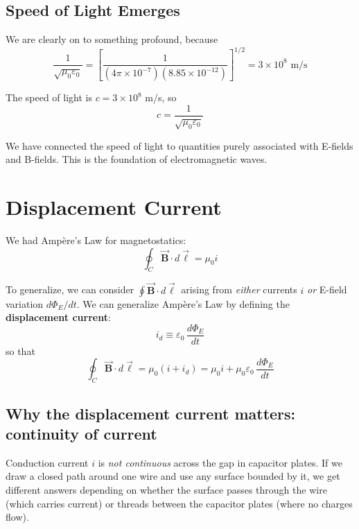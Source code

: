 \documentclass[11pt]{report}
\newcommand{\vbf}[1]{\vec{\mathbf{#1}}}
\begin{document}
\subsection*{Speed of Light Emerges}

We are clearly on to something profound, because
\begin{equation}
\frac{1}{\sqrt{\mu_0\varepsilon_0}} = \left[\frac{1}{(4\pi\times 10^{-7})(8.85\times 10^{-12})}\right]^{1/2} = 3\times 10^8\text{ m/s}
\end{equation}

The speed of light is $c = 3\times 10^8$ m/s, so
\begin{equation}
\boxed{c = \frac{1}{\sqrt{\mu_0\varepsilon_0}}}
\end{equation}

We have connected the speed of light to quantities purely associated with E-fields and B-fields. This is the foundation of electromagnetic waves.

\section{Displacement Current}

We had Amp\`ere's Law for magnetostatics:
\begin{equation}
\oint_C \vbf{B}\cdot d\vbf{\ell} = \mu_0 i
\end{equation}

To generalize, we can consider $\oint \vbf{B}\cdot d\vbf{\ell}$ arising from \emph{either} currents $i$ \emph{or} E-field variation $d\Phi_E/dt$. We can generalize Amp\`ere's Law by defining the \textbf{displacement current}:
\begin{equation}
\boxed{i_d \equiv \varepsilon_0\,\frac{d\Phi_E}{dt}}
\end{equation}
so that
\begin{equation}
\boxed{\oint_C \vbf{B}\cdot d\vbf{\ell} = \mu_0(i + i_d) = \mu_0 i + \mu_0\varepsilon_0\,\frac{d\Phi_E}{dt}}
\end{equation}

\subsection*{Why the displacement current matters: continuity of current}

Conduction current $i$ is \emph{not continuous} across the gap in capacitor plates. If we draw a closed path around one wire and use any surface bounded by it, we get different answers depending on whether the surface passes through the wire (which carries current) or threads between the capacitor plates (where no charges flow).
\end{document}
